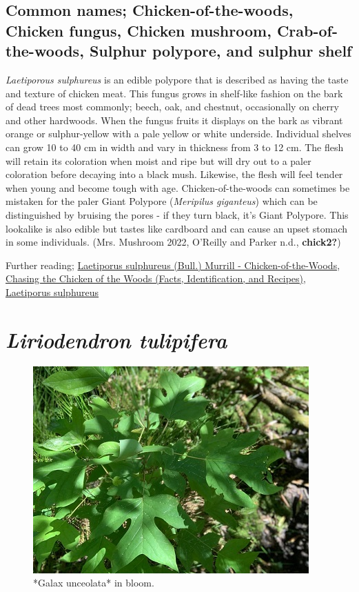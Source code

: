 \documentclass[
]{article}
\begin{document}
\hypertarget{common-names-chicken-of-the-woods-chicken-fungus-chicken-mushroom-crab-of-the-woods-sulphur-polypore-and-sulphur-shelf}{%
\subsection{Common names; Chicken-of-the-woods, Chicken fungus, Chicken mushroom, Crab-of-the-woods, Sulphur polypore, and sulphur shelf}\label{common-names-chicken-of-the-woods-chicken-fungus-chicken-mushroom-crab-of-the-woods-sulphur-polypore-and-sulphur-shelf}}

\emph{Laetiporous sulphureus} is an edible polypore that is described as having the taste and texture of chicken meat. This fungus grows in shelf-like fashion on the bark of dead trees most commonly; beech, oak, and chestnut, occasionally on cherry and other hardwoods. When the fungus fruits it displays on the bark as vibrant orange or sulphur-yellow with a pale yellow or white underside. Individual shelves can grow 10 to 40 cm in width and vary in thickness from 3 to 12 cm. The flesh will retain its coloration when moist and ripe but will dry out to a paler coloration before decaying into a black mush. Likewise, the flesh will feel tender when young and become tough with age. Chicken-of-the-woods can sometimes be mistaken for the paler Giant Polypore (\emph{Meripilus giganteus}) which can be distinguished by bruising the pores - if they turn black, it's Giant Polypore. This lookalike is also edible but tastes like cardboard and can cause an upset stomach in some individuals. (Mrs. Mushroom 2022, O'Reilly and Parker n.d., \textbf{chick2?})

Further reading; \href{https://www.first-nature.com/fungi/laetiporus-sulphureus.php}{Laetiporus sulphureus (Bull.) Murrill - Chicken-of-the-Woods}, \href{https://www.mushroom-appreciation.com/chicken-of-the-woods.html}{Chasing the Chicken of the Woods (Facts, Identification, and Recipes)},
\href{https://www.mushroomexpert.com/laetiporus_sulphureus.html}{Laetiporus sulphureus}

\hypertarget{liriodendron-tulipifera}{%
\section{\texorpdfstring{\emph{Liriodendron tulipifera}}{Liriodendron tulipifera}}\label{liriodendron-tulipifera}}

\begin{figure}

{\centering \includegraphics[width=0.5\linewidth]{tulip} 

}

\caption{*Galax unceolata* in bloom.}\label{fig:tulippop}
\end{figure}
\end{document}
